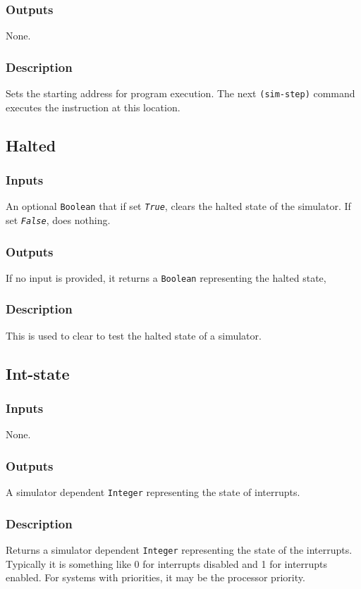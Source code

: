 \documentclass[10pt, openany]{book}
\newcommand{\constant}[1]{\emph{\texttt{#1}}}
\newcommand{\datatype}[1]{\texttt{#1}}
\begin{document}
\subsubsection{Outputs}
None.
\subsubsection{Description}
Sets the starting address for program execution.
The next \verb|(sim-step)| command executes the instruction at this location.

\subsection{Halted}
\subsubsection{Inputs}
An optional \datatype{Boolean} that if set \constant{True}, clears the halted state of the simulator.
If set \constant{False}, does nothing.
\subsubsection{Outputs}
If no input is provided, it returns a \datatype{Boolean} representing the halted state, 
\subsubsection{Description}
This is used to clear to test the halted state of a simulator.

\subsection{Int-state}
\subsubsection{Inputs}
None.
\subsubsection{Outputs}
A simulator dependent \datatype{Integer} representing the state of interrupts.
\subsubsection{Description}
Returns a simulator dependent \datatype{Integer} representing the state of the interrupts.
Typically it is something like 0 for interrupts disabled and 1 for interrupts enabled.
For systems with priorities, it may be the processor priority.
\end{document}
